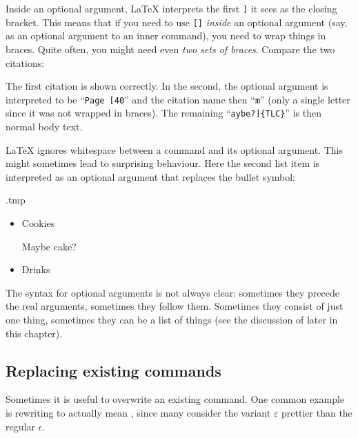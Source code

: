 \begin{gotcha}
Inside an optional argument, \LaTeX{} interprets the first \verb|]| it sees as the closing bracket.
This means that if you need to use \verb|[]| \emph{inside} an optional argument
(say, as an optional argument to an inner command), you need to wrap things in braces.
Quite often, you might need even \emph{two sets of braces}.
Compare the two citations:
%
\ShowExample
%
The first citation is shown correctly.
In the second, the optional argument is interpreted to be ``\verb|Page [40|''
and the citation name then ``\verb|m|'' (only a single letter since it was not wrapped in braces).
The remaining ``\verb|aybe?]{TLC}|'' is then normal body text.
\end{gotcha}

\begin{gotcha}
\LaTeX{} ignores whitespace between a command and its optional argument.
This might sometimes lead to surprising behaviour.
Here the second list item is interpreted as an optional argument that replaces the bullet symbol:
%
\begin{VerbatimOut}{\jobname.tmp}
\begin{itemize}
\item Cookies
\item [Maybe cake?]
\item Drinks
\end{itemize}
\end{VerbatimOut}
\ShowExample
\end{gotcha}


The syntax for optional arguments is not always clear:
sometimes they precede the real arguments, sometimes they follow them.
Sometimes they consist of just one thing,
sometimes they can be a list of things
(see the discussion of  later in this chapter).


%
\subsection{Replacing existing commands}

Sometimes it is useful to overwrite an existing command.
One common example is rewriting  to actually mean ,
since many consider the variant $\varepsilon$ prettier than the regular $\epsilon$.

